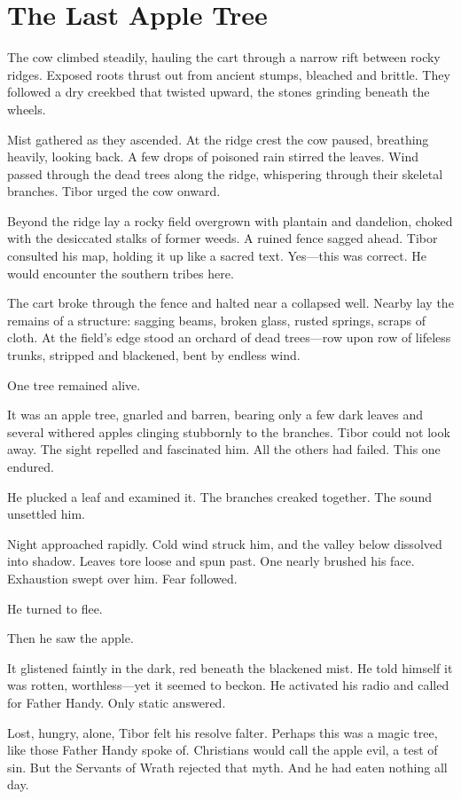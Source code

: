 \chapter{The Last Apple Tree}

The cow climbed steadily, hauling the cart through a narrow rift between rocky ridges. Exposed roots thrust out from ancient stumps, bleached and brittle. They followed a dry creekbed that twisted upward, the stones grinding beneath the wheels.

Mist gathered as they ascended. At the ridge crest the cow paused, breathing heavily, looking back. A few drops of poisoned rain stirred the leaves. Wind passed through the dead trees along the ridge, whispering through their skeletal branches. Tibor urged the cow onward.

Beyond the ridge lay a rocky field overgrown with plantain and dandelion, choked with the desiccated stalks of former weeds. A ruined fence sagged ahead. Tibor consulted his map, holding it up like a sacred text. Yes—this was correct. He would encounter the southern tribes here.

The cart broke through the fence and halted near a collapsed well. Nearby lay the remains of a structure: sagging beams, broken glass, rusted springs, scraps of cloth. At the field’s edge stood an orchard of dead trees—row upon row of lifeless trunks, stripped and blackened, bent by endless wind.

One tree remained alive.

It was an apple tree, gnarled and barren, bearing only a few dark leaves and several withered apples clinging stubbornly to the branches. Tibor could not look away. The sight repelled and fascinated him. All the others had failed. This one endured.

He plucked a leaf and examined it. The branches creaked together. The sound unsettled him.

Night approached rapidly. Cold wind struck him, and the valley below dissolved into shadow. Leaves tore loose and spun past. One nearly brushed his face. Exhaustion swept over him. Fear followed.

He turned to flee.

Then he saw the apple.

It glistened faintly in the dark, red beneath the blackened mist. He told himself it was rotten, worthless—yet it seemed to beckon. He activated his radio and called for Father Handy. Only static answered.

Lost, hungry, alone, Tibor felt his resolve falter. Perhaps this was a magic tree, like those Father Handy spoke of. Christians would call the apple evil, a test of sin. But the Servants of Wrath rejected that myth. And he had eaten nothing all day.

